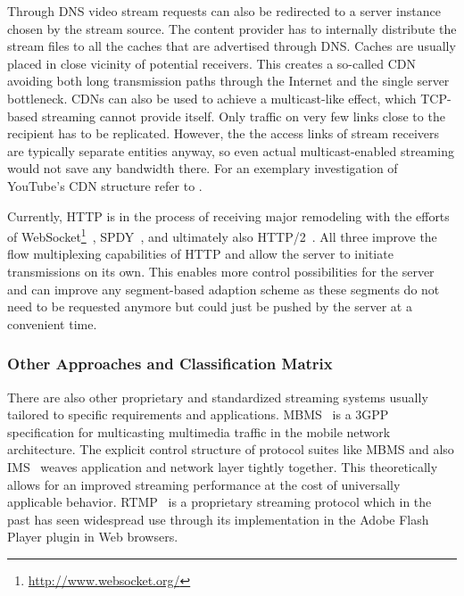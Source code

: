 Through \acrshort{DNS} video stream requests can also be redirected to a server instance chosen by the stream source. The content provider has to internally distribute the stream files to all the caches that are advertised through \gls{DNS}. Caches are usually placed in close vicinity of potential receivers. This creates a so-called \gls{CDN} avoiding both long transmission paths through the Internet and the single server bottleneck. \glspl{CDN} can also be used to achieve a multicast-like effect, which \gls{TCP}-based streaming cannot provide itself. Only traffic on very few links close to the recipient has to be replicated. However, the the access links of stream receivers are typically separate entities anyway, so even actual multicast-enabled streaming would not save any bandwidth there. For an exemplary investigation of YouTube's \gls{CDN} structure refer to \cite{rafetseder2011explyt}.

Currently, \gls{HTTP} is in the process of receiving major remodeling with the efforts of WebSocket\footnote{\url{http://www.websocket.org/}}~\cite{rfc6455}, SPDY~\cite{google2011SPDYdef,google2010SPDYwp}, and ultimately also HTTP/2~\cite{http20draft}. All three improve the flow multiplexing capabilities of \gls{HTTP} and allow the server to initiate transmissions on its own. This enables more control possibilities for the server and can improve any segment-based adaption scheme as these segments do not need to be requested anymore but could just be pushed by the server at a convenient time.

\subsubsection{Other Approaches and Classification Matrix}

There are also other proprietary and standardized streaming systems usually tailored to specific requirements and applications. \gls{MBMS}~\cite{3gpp.22.146,3gpp.22.246} is a \gls{3GPP} specification for multicasting multimedia traffic in the mobile network architecture. The explicit control structure of protocol suites like \gls{MBMS} and also \gls{IMS}~\cite{3gpp.23.228} weaves application and network layer tightly together. This theoretically allows for an improved streaming performance at the cost of universally applicable behavior. \gls{RTMP}~\cite{rtmpspec} is a proprietary streaming protocol which in the past has seen widespread use through its implementation in the Adobe Flash Player plugin in Web browsers. 

